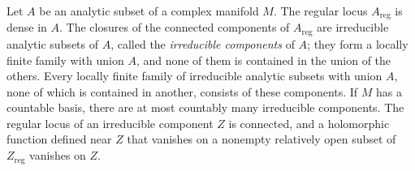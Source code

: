 \begin{corollary}\label{cor:analytic-global-components}
Let $A$ be an analytic subset of a complex manifold $M$. The regular locus $A_{\mathrm{reg}}$ is dense in $A$. The closures of the connected components of $A_{\mathrm{reg}}$ are irreducible analytic subsets of $A$, called the \emph{irreducible components} of $A$; they form a locally finite family with union $A$, and none of them is contained in the union of the others. Every locally finite family of irreducible analytic subsets with union $A$, none of which is contained in another, consists of these components. If $M$ has a countable basis, there are at most countably many irreducible components. The regular locus of an irreducible component $Z$ is connected, and a holomorphic function defined near $Z$ that vanishes on a nonempty relatively open subset of $Z_{\mathrm{reg}}$ vanishes on $Z$.
\end{corollary}
